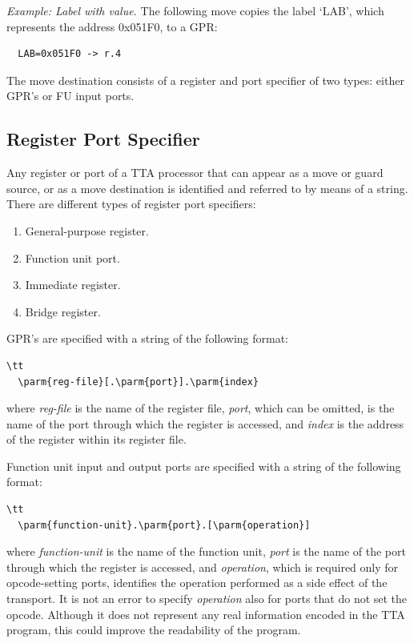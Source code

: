 \documentclass[twoside]{tceusermanual}
\begin{document}
\emph{Example: Label with value.}
%
The following move copies the label `LAB', which represents the address
0x051F0, to a GPR:
\begin{verbatim}
  LAB=0x051F0 -> r.4
\end{verbatim}

The move destination consists of a register and port specifier of two types:
either GPR's or FU input ports.

\subsection{Register Port Specifier}
\label{ssec:move-terminal}

Any register or port of a TTA processor that can appear as a move or guard
source, or as a move destination is identified and referred to by means of a
string.
%
There are different types of register port specifiers:
\begin{enumerate}
\item %
  General-purpose register.
\item %
  Function unit port.
\item %
  Immediate register.
\item %
  Bridge register.
\end{enumerate}

GPR's are specified with a string of the following format:

\begin{verbatim}\tt
  \parm{reg-file}[.\parm{port}].\parm{index}
\end{verbatim}

where \emph{reg-file} is the name of the register file,
%
%
\emph{port}, which can be omitted, is the name of the port through which the
register is accessed, and \emph{index} is the address of the register within
its register file.

Function unit input and output ports are specified with a string of the
following format:

\begin{verbatim}\tt
  \parm{function-unit}.\parm{port}.[\parm{operation}]
\end{verbatim}

where \emph{function-unit} is the name of the function unit, \emph{port} is
the name of the port through which the register is accessed, and
\emph{operation}, which is required only for opcode-setting ports,
identifies the operation performed as a side effect of the transport.
%
It is not an error to specify \emph{operation} also for ports that do not
set the opcode.  Although it does not represent any real information encoded
in the TTA program, this could improve the readability of the program.
\end{document}

